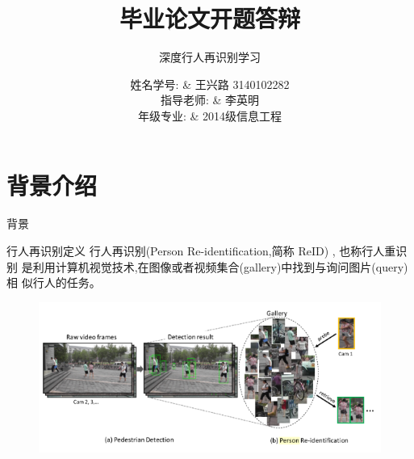\documentclass[notes]{beamer}
\title[毕设开题]{毕业论文开题答辩}
\subtitle{深度行人再识别学习}
\author[xinglu]{ 
	姓名学号: & 王兴路 3140102282 \\
指导老师: & 李英明 \\
年级专业: & 2014级信息工程
}
\institute[信工1403]{}
\date[\today]{}
\begin{document}


\begin{frame}
	\titlepage
\end{frame}

\section{背景介绍}
\begin{frame}{背景}
	

\end{frame}



\begin{frame}
	{行人再识别定义}
	行人再识别(Person Re-identification,简称 ReID) , 也称行人重识别
	是利用计算机视觉技术,在图像或者视频集合(gallery)中找到与询问图片(query)相
	似行人的任务。
	

	\begin{figure}
		\includegraphics[width=0.7\linewidth]{2018-03-07-19-55-19.png}
	\end{figure}
\end{frame}
\end{document}
